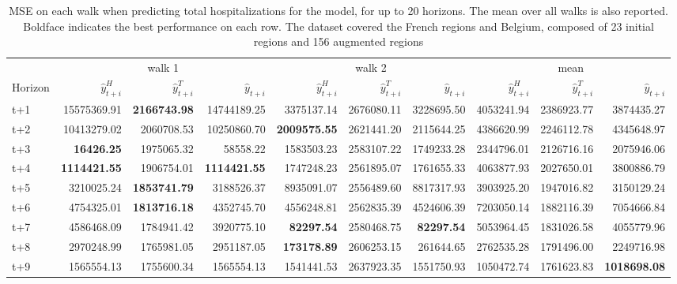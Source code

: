 \begin{table}[H]
\centering
\caption{MSE on each walk when predicting total hospitalizations for the model, for up to 20 horizons. The mean over all walks is also reported. Boldface indicates the best performance on each row. The dataset covered the French regions and Belgium, composed of 23 initial regions and 156 augmented regions }
\label{tab:MSE_walk_assemble}
\begin{tabular}{lrrrrrrrrr}
\toprule
 & \multicolumn{3}{c}{walk 1} & \multicolumn{3}{c}{walk 2} & \multicolumn{3}{c}{mean} 
\\

\cmidrule(lr){2-4} \cmidrule(lr){5-7} \cmidrule(lr){8-10} 
Horizon & $\hat{y}_{t+i}^H$ & $\hat{y}_{t+i}^T$ & $\hat{y}_{t+i}$ & $\hat{y}_{t+i}^H$ & $\hat{y}_{t+i}^T$ & $\hat{y}_{t+i}$ & $\hat{y}_{t+i}^H$ & $\hat{y}_{t+i}^T$ & $\hat{y}_{t+i}$ \\
\midrule
t+1  & 15575369.91  & \textbf{2166743.98}  & 14744189.25  & 3375137.14  & 2676080.11  & 3228695.50  & 4053241.94  & 2386923.77  & 3874435.27  \\
t+2  & 10413279.02  & 2060708.53  & 10250860.70  & \textbf{2009575.55}  & 2621441.20  & 2115644.25  & 4386620.99  & 2246112.78  & 4345648.97  \\
t+3  & \textbf{16426.25}  & 1975065.32  & 58558.22  & 1583503.23  & 2583107.22  & 1749233.28  & 2344796.01  & 2126716.16  & 2075946.06  \\
t+4  & \textbf{1114421.55}  & 1906754.01  & \textbf{1114421.55}  & 1747248.23  & 2561895.07  & 1761655.33  & 4063877.93  & 2027650.01  & 3800886.79  \\
t+5  & 3210025.24  & \textbf{1853741.79}  & 3188526.37  & 8935091.07  & 2556489.60  & 8817317.93  & 3903925.20  & 1947016.82  & 3150129.24  \\
t+6  & 4754325.01  & \textbf{1813716.18}  & 4352745.70  & 4556248.81  & 2562835.39  & 4524606.39  & 7203050.14  & 1882116.39  & 7054666.84  \\
t+7  & 4586468.09  & 1784941.42  & 3920775.10  & \textbf{82297.54}  & 2580468.75  & \textbf{82297.54}  & 5053964.45  & 1831026.58  & 4055779.96  \\
t+8  & 2970248.99  & 1765981.05  & 2951187.05  & \textbf{173178.89}  & 2606253.15  & 261644.65  & 2762535.28  & 1791496.00  & 2249716.98  \\
t+9  & 1565554.13  & 1755600.34  & 1565554.13  & 1541441.53  & 2637923.35  & 1551750.93  & 1050472.74  & 1761623.83  & \textbf{1018698.08}  \\

\end{tabular}
\end{table}
